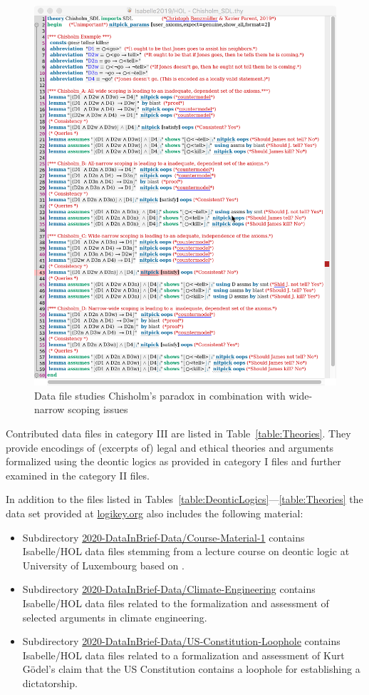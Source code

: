 \documentclass{article}
\begin{document}
\begin{figure}[ht!]
 \includegraphics[width=\textwidth]{Chisholm_SDL.png}
\caption{Data file \textsf{\small {}
    studies 
    Chisholm's paradox in combination with 
    wide-narrow scoping issues \label{fig:Chisholm_SDL}}}
\end{figure}

Contributed data files in category III are listed in
Table~\ref{table:Theories}. They provide encodings of (excerpts of)
legal and ethical theories and arguments formalized using the deontic logics as
provided in category I files and further examined in the category II
files.

In addition to the files listed in
Tables~\ref{table:DeonticLogics}---\ref{table:Theories} the data set
provided at \url{logikey.org} also includes the following material:
\begin{itemize}
\item Subdirectory \url{2020-DataInBrief-Data/Course-Material-1} contains Isabelle/HOL data files stemming from a
  lecture course on deontic logic at University of Luxembourg based on \cite{textbook18 }.
\item Subdirectory \url{2020-DataInBrief-Data/Climate-Engineering} contains Isabelle/HOL data files related to the
  formalization and assessment  \cite{C82}  of selected arguments in climate engineering.
\item  Subdirectory \url{2020-DataInBrief-Data/US-Constitution-Loophole} contains Isabelle/HOL data files related to a 
  formalization and assessment  \cite{zahoransky19} of Kurt Gödel's claim that the US Constitution contains a
  loophole for establishing a dictatorship.
\end{itemize}
\end{document}

